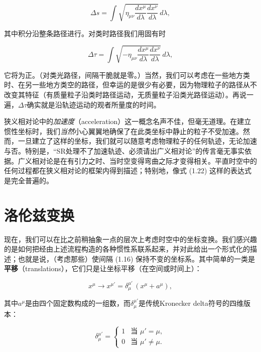 \begin{equation*}
\Delta s = \int \sqrt{\eta_{\mu\nu}\frac{dx^\mu}{d\lambda}\frac{dx^\nu}{d\lambda}}\,d\lambda,
\tag{1.21}
\end{equation*}

其中积分沿整条路径进行。对类时路径我们用固有时

\begin{equation*}
\Delta\tau = \int \sqrt{-\eta_{\mu\nu}\frac{dx^\mu}{d\lambda}\frac{dx^\nu}{d\lambda}}\,d\lambda,
\tag{1.22}
\end{equation*}

它将为正。（对类光路径，间隔干脆就是零。）当然，我们可以考虑在一些地方类时、在另一些地方类空的路径，但幸运的是很少有必要，因为物理粒子的路径从不改变其特征（有质量粒子沿类时路径运动，无质量粒子沿类光路径运动）。再说一遍，$\Delta\tau$确实就是沿轨迹运动的观者所量度的时间。

狭义相对论中的\emph{加速度}（acceleration）这一概念名声不佳，但毫无道理。在建立惯性坐标时，我们\emph{当然}小心翼翼地确保了在此类坐标中静止的粒子不受加速。然而，一旦建立了这样的坐标，我们就可以随意考虑物理粒子的任何轨迹，无论加速与否。特别是，“SR处理不了加速轨迹、必须请出广义相对论”的传言毫无事实依据。广义相对论是在有引力之时、当时空变得弯曲之际才变得相关。平直时空中的任何过程都在狭义相对论的框架内得到描述；特别地，像式 (1.22) 这样的表达式是完全普遍的。

\section{洛伦兹变换}

现在，我们可以在比之前稍抽象一点的层次上考虑时空中的坐标变换。我们感兴趣的是如何把经由上述流程构造的各种惯性系联系起来，并对此给出一个形式化的描述；也就是说，（考虑那些）使间隔 (1.16) 保持不变的坐标系。其中简单的一类是\textbf{平移}（translations），它们只是让坐标平移（在空间或时间上）：

\begin{equation*}
x^\mu \rightarrow x^{\mu'} = \delta^{\mu'}_{\mu}\,(x^\mu + a^\mu),
\tag{1.23}
\end{equation*}

其中$a^\mu$是由四个固定数构成的一组数，而$\delta^{\mu'}_{\mu}$是传统Kronecker delta符号的四维版本：

\begin{equation*}
\delta^{\mu'}_{\mu} =
\begin{cases}
1 & \text{当 } \mu' = \mu, \\
0 & \text{当 } \mu' \neq \mu.
\end{cases}
\tag{1.24}
\end{equation*}

